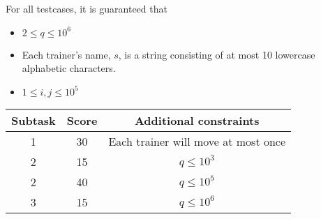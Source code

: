 For all testcases, it is guaranteed that
 
\begin{itemize}
\item $2 \leq q \leq 10^6$

\item Each trainer's name, $s$, is a string consisting of at most 10 lowercase alphabetic characters.

\item $1 \leq i, j \leq 10^5$
\end{itemize}


\begin{center}
\begin{tabular}{|c|c|c|} 
\hline
\textbf{Subtask} & \textbf{Score} & \textbf{Additional constraints} \\
\hline
1 & 30 & Each trainer will move at most once \\ 
\hline
2 & 15 & $q \leq 10^3$ \\
\hline
2 & 40 & $q \leq 10^5$ \\ 
\hline
3 & 15 & $q \leq 10^6$ \\ 
\hline
\end{tabular}
\end{center}
